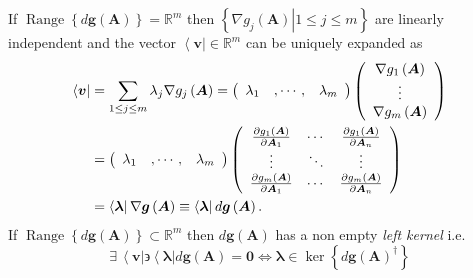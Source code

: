 \documentclass[aps,preprint]{revtex4}%
\begin{document}
If $\operatorname*{Range}\left\{  d\boldsymbol{g}\left(  \boldsymbol{A}%
\right)  \right\}  =\mathbb{R}^{m}$ then $\left\{  \left.  \nabla g_{j}\left(
\boldsymbol{A}\right)  \right\vert 1\leq j\leq m\right\}  $ are linearly
independent and the vector $\left\langle \boldsymbol{v}\right\vert
\in\mathbb{R}^{m}$ can be uniquely expanded as
\begin{align}
\left\langle \boldsymbol{v}\right\vert  &  =\sum_{1\leq j\leq m}\lambda
_{j}\nabla g_{j}\left(  \boldsymbol{A}\right)  =\left(
\begin{array}
[c]{ccc}%
\lambda_{1} & ,\cdots, & \lambda_{m}%
\end{array}
\right)  \left(
\begin{array}
[c]{c}%
\nabla g_{1}\left(  \boldsymbol{A}\right) \\
\vdots\\
\nabla g_{m}\left(  \boldsymbol{A}\right)
\end{array}
\right) \nonumber\\
&  =\left(
\begin{array}
[c]{ccc}%
\lambda_{1} & ,\cdots, & \lambda_{m}%
\end{array}
\right)  \left(
\begin{array}
[c]{ccc}%
\frac{\partial g_{1}\left(  \boldsymbol{A}\right)  }{\partial\boldsymbol{A}%
_{1}} & \cdots & \frac{\partial g_{1}\left(  \boldsymbol{A}\right)  }%
{\partial\boldsymbol{A}_{n}}\\
\vdots & \ddots & \vdots\\
\frac{\partial g_{m}\left(  \boldsymbol{A}\right)  }{\partial\boldsymbol{A}%
_{1}} & \cdots & \frac{\partial g_{m}\left(  \boldsymbol{A}\right)  }%
{\partial\boldsymbol{A}_{n}}%
\end{array}
\right) \nonumber\\
&  =\left\langle \boldsymbol{\lambda}\right\vert \nabla\boldsymbol{g}\left(
\boldsymbol{A}\right)  \equiv\left\langle \boldsymbol{\lambda}\right\vert
d\boldsymbol{g}\left(  \boldsymbol{A}\right)  .
\end{align}
If $\operatorname*{Range}\left\{  d\boldsymbol{g}\left(  \boldsymbol{A}%
\right)  \right\}  \subset\mathbb{R}^{m}$ then $d\boldsymbol{g}\left(
\boldsymbol{A}\right)  $ has a non empty \emph{left kernel} i.e.
\begin{equation}
\exists\,\left\langle \boldsymbol{v}\right\vert \backepsilon\left\langle
\boldsymbol{\lambda}\right\vert d\boldsymbol{g}\left(  \boldsymbol{A}\right)
=\boldsymbol{0}\Longleftrightarrow\boldsymbol{\lambda\in}\ker\left\{
d\boldsymbol{g}\left(  \boldsymbol{A}\right)  ^{\dagger}\right\}
\end{equation}
\end{document}
